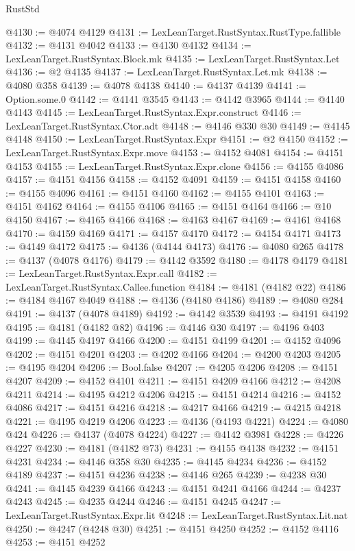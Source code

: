 \begin{lexlean}{RustStd}
\begin{coremodule}
{\begin{coremodule}
{{{{{{{{{{{{{{{{{{{{{{{{{{{{{{{{{{{{{{{{{{{{{{{{{{@4130 := @4074 @4129
@4131 := LexLeanTarget.RustSyntax.RustType.fallible
@4132 := @4131 @4042
@4133 := @4130 @4132
@4134 := LexLeanTarget.RustSyntax.Block.mk
@4135 := LexLeanTarget.RustSyntax.Let
@4136 := @2 @4135
@4137 := LexLeanTarget.RustSyntax.Let.mk
@4138 := @4080 @358
@4139 := @4078 @4138
@4140 := @4137 @4139
@4141 := Option.some.{0}
@4142 := @4141 @3545
@4143 := @4142 @3965
@4144 := @4140 @4143
@4145 := LexLeanTarget.RustSyntax.Expr.construct
@4146 := LexLeanTarget.RustSyntax.Ctor.adt
@4148 := @4146 @330 @30
@4149 := @4145 @4148
@4150 := LexLeanTarget.RustSyntax.Expr
@4151 := @2 @4150
@4152 := LexLeanTarget.RustSyntax.Expr.move
@4153 := @4152 @4081
@4154 := @4151 @4153
@4155 := LexLeanTarget.RustSyntax.Expr.clone
@4156 := @4155 @4086
@4157 := @4151 @4156
@4158 := @4152 @4091
@4159 := @4151 @4158
@4160 := @4155 @4096
@4161 := @4151 @4160
@4162 := @4155 @4101
@4163 := @4151 @4162
@4164 := @4155 @4106
@4165 := @4151 @4164
@4166 := @10 @4150
@4167 := @4165 @4166
@4168 := @4163 @4167
@4169 := @4161 @4168
@4170 := @4159 @4169
@4171 := @4157 @4170
@4172 := @4154 @4171
@4173 := @4149 @4172
@4175 := @4136 (@4144 @4173)
@4176 := @4080 @265
@4178 := @4137 (@4078 @4176)
@4179 := @4142 @3592
@4180 := @4178 @4179
@4181 := LexLeanTarget.RustSyntax.Expr.call
@4182 := LexLeanTarget.RustSyntax.Callee.function
@4184 := @4181 (@4182 @22)
@4186 := @4184 @4167 @4049
@4188 := @4136 (@4180 @4186)
@4189 := @4080 @284
@4191 := @4137 (@4078 @4189)
@4192 := @4142 @3539
@4193 := @4191 @4192
@4195 := @4181 (@4182 @82)
@4196 := @4146 @30
@4197 := @4196 @403
@4199 := @4145 @4197 @4166
@4200 := @4151 @4199
@4201 := @4152 @4096
@4202 := @4151 @4201
@4203 := @4202 @4166
@4204 := @4200 @4203
@4205 := @4195 @4204
@4206 := Bool.false
@4207 := @4205 @4206
@4208 := @4151 @4207
@4209 := @4152 @4101
@4211 := @4151 @4209 @4166
@4212 := @4208 @4211
@4214 := @4195 @4212 @4206
@4215 := @4151 @4214
@4216 := @4152 @4086
@4217 := @4151 @4216
@4218 := @4217 @4166
@4219 := @4215 @4218
@4221 := @4195 @4219 @4206
@4223 := @4136 (@4193 @4221)
@4224 := @4080 @424
@4226 := @4137 (@4078 @4224)
@4227 := @4142 @3981
@4228 := @4226 @4227
@4230 := @4181 (@4182 @73)
@4231 := @4155 @4138
@4232 := @4151 @4231
@4234 := @4146 @358 @30
@4235 := @4145 @4234
@4236 := @4152 @4189
@4237 := @4151 @4236
@4238 := @4146 @265
@4239 := @4238 @30
@4241 := @4145 @4239 @4166
@4243 := @4151 @4241 @4166
@4244 := @4237 @4243
@4245 := @4235 @4244
@4246 := @4151 @4245
@4247 := LexLeanTarget.RustSyntax.Expr.lit
@4248 := LexLeanTarget.RustSyntax.Lit.nat
@4250 := @4247 (@4248 @30)
@4251 := @4151 @4250
@4252 := @4152 @4116
@4253 := @4151 @4252
}}}}}}}}}}}}}}}}}}}}}}}}}}}}}}}}}}}}}}}}}}}}}}}}}}
\end{coremodule}}
\end{coremodule}
\end{lexlean}
